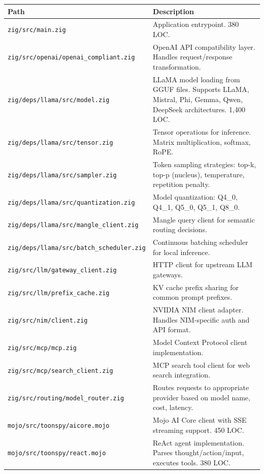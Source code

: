 \documentclass[11pt,a4paper]{article}
\begin{document}
\begin{longtable}{@{}L{6cm}L{8cm}@{}}
\toprule
\textbf{Path} & \textbf{Description} \\
\midrule
\endhead
\texttt{zig/src/main.zig} & Application entrypoint. 380 LOC. \\
\texttt{zig/src/openai/openai\_compliant.zig} & OpenAI API compatibility layer. Handles request/response transformation. \\
\texttt{zig/deps/llama/src/model.zig} & LLaMA model loading from GGUF files. Supports LLaMA, Mistral, Phi, Gemma, Qwen, DeepSeek architectures. 1,400 LOC. \\
\texttt{zig/deps/llama/src/tensor.zig} & Tensor operations for inference. Matrix multiplication, softmax, RoPE. \\
\texttt{zig/deps/llama/src/sampler.zig} & Token sampling strategies: top-k, top-p (nucleus), temperature, repetition penalty. \\
\texttt{zig/deps/llama/src/quantization.zig} & Model quantization: Q4\_0, Q4\_1, Q5\_0, Q5\_1, Q8\_0. \\
\texttt{zig/deps/llama/src/mangle\_client.zig} & Mangle query client for semantic routing decisions. \\
\texttt{zig/deps/llama/src/batch\_scheduler.zig} & Continuous batching scheduler for local inference. \\
\texttt{zig/src/llm/gateway\_client.zig} & HTTP client for upstream LLM gateways. \\
\texttt{zig/src/llm/prefix\_cache.zig} & KV cache prefix sharing for common prompt prefixes. \\
\texttt{zig/src/nim/client.zig} & NVIDIA NIM client adapter. Handles NIM-specific auth and API format. \\
\texttt{zig/src/mcp/mcp.zig} & Model Context Protocol client implementation. \\
\texttt{zig/src/mcp/search\_client.zig} & MCP search tool client for web search integration. \\
\texttt{zig/src/routing/model\_router.zig} & Routes requests to appropriate provider based on model name, cost, latency. \\
\texttt{mojo/src/toonspy/aicore.mojo} & Mojo AI Core client with SSE streaming support. 450 LOC. \\
\texttt{mojo/src/toonspy/react.mojo} & ReAct agent implementation. Parses thought/action/input, executes tools. 380 LOC. \\
\bottomrule
\end{longtable}
\end{document}
